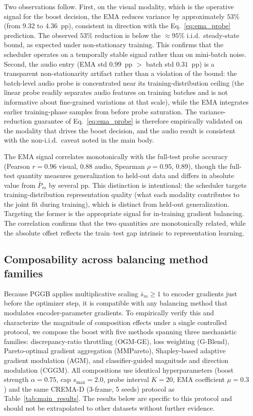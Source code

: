 \documentclass{article}
\begin{document}
Two observations follow. First, on the visual modality, which is the operative signal for the boost decision, the EMA reduces variance by approximately $53\%$ (from $9.32$ to $4.36$~pp), consistent in direction with the Eq.~\ref{eq:ema_probe} prediction. The observed $53\%$ reduction is below the $\approx 95\%$ i.i.d.\ steady-state bound, as expected under non-stationary training. This confirms that the scheduler operates on a temporally stable signal rather than on mini-batch noise. Second, the audio entry (EMA std $0.99$~pp $>$ batch std $0.31$~pp) is a transparent non-stationarity artifact rather than a violation of the bound: the batch-level audio probe is concentrated near its training-distribution ceiling (the linear probe readily separates audio features on training batches and is not informative about fine-grained variations at that scale), while the EMA integrates earlier training-phase samples from before probe saturation. The variance-reduction guarantee of Eq.~\ref{eq:ema_probe} is therefore empirically validated on the modality that drives the boost decision, and the audio result is consistent with the non-i.i.d.\ caveat noted in the main body.

The EMA signal correlates monotonically with the full-test probe accuracy (Pearson $r=0.96$ visual, $0.88$ audio, Spearman $\rho=0.95$, $0.89$), though the full-test quantity measures generalization to held-out data and differs in absolute value from $\bar{P}_m$ by several pp. This distinction is intentional: the scheduler targets training-distribution representation quality (what each modality contributes to the joint fit during training), which is distinct from held-out generalization. Targeting the former is the appropriate signal for in-training gradient balancing. The correlation confirms that the two quantities are monotonically related, while the absolute offset reflects the train--test gap intrinsic to representation learning.

\subsection{Composability across balancing method families}
\label{app:composability}

Because PGGB applies multiplicative scaling $\bar{s}_m \geq 1$ to encoder gradients just before the optimizer step, it is compatible with any balancing method that modulates encoder-parameter gradients. To empirically verify this and characterize the magnitude of composition effects under a single controlled protocol, we compose the boost with five methods spanning three mechanistic families: discrepancy-ratio throttling (OGM-GE), loss weighting (G-Blend), Pareto-optimal gradient aggregation (MMPareto), Shapley-based adaptive gradient modulation (AGM), and classifier-guided magnitude and direction modulation (CGGM). All compositions use identical hyperparameters (boost strength $\alpha=0.75$, cap $s_{\max}=2.0$, probe interval $K=20$, EMA coefficient $\mu=0.3$) and the same CREMA-D (3-frame, 5 seeds) protocol as Table~\ref{tab:main_results}. The results below are specific to this protocol and should not be extrapolated to other datasets without further evidence.
\end{document}
